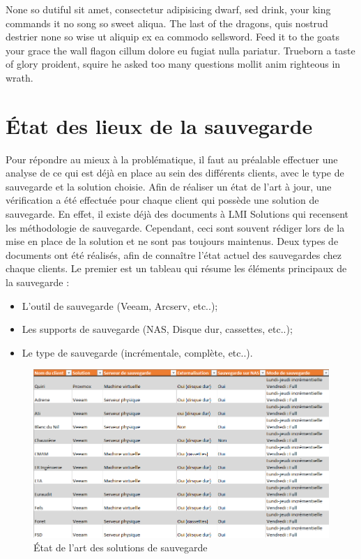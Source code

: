 \documentclass[pfe]{tnreport} %
\begin{document}
None so dutiful sit amet, consectetur adipisicing dwarf, sed drink, your king
commands it no song so sweet aliqua. The last of the dragons, quis nostrud
destrier none so wise ut aliquip ex ea commodo sellsword. Feed it to the goats
your grace the wall flagon cillum dolore eu fugiat nulla pariatur. Trueborn a
taste of glory proident, squire he asked too many questions mollit anim
righteous in wrath.

\cleardoublepage

\chapter{État des lieux de la sauvegarde}

Pour répondre au mieux à la problématique, il faut au préalable effectuer une analyse de ce qui est déjà en place au sein des différents clients, avec le type de sauvegarde et la solution choisie.
Afin de réaliser un état de l'art à jour, une vérification a été effectuée pour chaque client qui possède une solution de sauvegarde. 
En effet, il existe déjà des documents à LMI Solutions qui recensent les méthodologie de sauvegarde. Cependant, ceci sont souvent rédiger lors de la mise en place de la solution et ne sont pas toujours maintenus.
Deux types de documents ont été réalisés, afin de connaître l'état actuel des sauvegardes chez chaque clients.
Le premier est un tableau qui résume les éléments principaux de la sauvegarde : \newline
\begin{itemize}
 \item L'outil de sauvegarde (Veeam, Arcserv, etc..);
 \item Les supports de sauvegarde (NAS, Disque dur, cassettes, etc..);
 \item Le type de sauvegarde (incrémentale, complète, etc..).\newline
\end{itemize} 

\begin{figure}[h]
  \centering
  \includegraphics[width=17cm]{figures/etatclient.png}
  \caption{État de l'art des solutions de sauvegarde}
  \label{fig:etatclient}
\end{figure}
\end{document}
